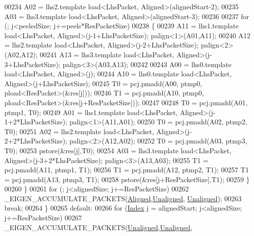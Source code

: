 \begin{DoxyCode}
{00234               A02 = lhs2.template load<LhsPacket, Aligned>(alignedStart-2);
00235               A03 = lhs3.template load<LhsPacket, Aligned>(alignedStart-3);
00236 
00237               \textcolor{keywordflow}{for} (; j<peeledSize; j+=peels*ResPacketSize)
00238               \{
00239                 A11 = lhs1.template load<LhsPacket, Aligned>(j-1+LhsPacketSize);  palign<1>(A01,A11);
00240                 A12 = lhs2.template load<LhsPacket, Aligned>(j-2+LhsPacketSize);  palign<2>(A02,A12);
00241                 A13 = lhs3.template load<LhsPacket, Aligned>(j-3+LhsPacketSize);  palign<3>(A03,A13);
00242 
00243                 A00 = lhs0.template load<LhsPacket, Aligned>(j);
00244                 A10 = lhs0.template load<LhsPacket, Aligned>(j+LhsPacketSize);
00245                 T0  = pcj.pmadd(A00, ptmp0, pload<ResPacket>(&res[j]));
00246                 T1  = pcj.pmadd(A10, ptmp0, pload<ResPacket>(&res[j+ResPacketSize]));
00247 
00248                 T0  = pcj.pmadd(A01, ptmp1, T0);
00249                 A01 = lhs1.template load<LhsPacket, Aligned>(j-1+2*LhsPacketSize);  palign<1>(A11,A01);
00250                 T0  = pcj.pmadd(A02, ptmp2, T0);
00251                 A02 = lhs2.template load<LhsPacket, Aligned>(j-2+2*LhsPacketSize);  palign<2>(A12,A02);
00252                 T0  = pcj.pmadd(A03, ptmp3, T0);
00253                 pstore(&res[j],T0);
00254                 A03 = lhs3.template load<LhsPacket, Aligned>(j-3+2*LhsPacketSize);  palign<3>(A13,A03);
00255                 T1  = pcj.pmadd(A11, ptmp1, T1);
00256                 T1  = pcj.pmadd(A12, ptmp2, T1);
00257                 T1  = pcj.pmadd(A13, ptmp3, T1);
00258                 pstore(&res[j+ResPacketSize],T1);
00259               \}
00260             \}
00261             \textcolor{keywordflow}{for} (; j<alignedSize; j+=ResPacketSize)
00262               \_EIGEN\_ACCUMULATE\_PACKETS(\hyperlink{group__enums_gga45fe06e29902b7a2773de05ba27b47a1ad37d4c71425bb286e9b4103830538fbf}{Aligned},\hyperlink{group__enums_gga45fe06e29902b7a2773de05ba27b47a1ac935220b4c844108e183ebe30a4d5204}{Unaligned},
      \hyperlink{group__enums_gga45fe06e29902b7a2773de05ba27b47a1ac935220b4c844108e183ebe30a4d5204}{Unaligned});
00263             \textcolor{keywordflow}{break};
00264           \}
00265           \textcolor{keywordflow}{default}:
00266             \textcolor{keywordflow}{for} (\hyperlink{namespace_eigen_a62e77e0933482dafde8fe197d9a2cfde}{Index} j = alignedStart; j<alignedSize; j+=ResPacketSize)
00267               \_EIGEN\_ACCUMULATE\_PACKETS(\hyperlink{group__enums_gga45fe06e29902b7a2773de05ba27b47a1ac935220b4c844108e183ebe30a4d5204}{Unaligned},\hyperlink{group__enums_gga45fe06e29902b7a2773de05ba27b47a1ac935220b4c844108e183ebe30a4d5204}{Unaligned},
}
\end{DoxyCode}

